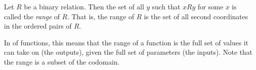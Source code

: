 \documentclass{article}
\begin{document}
Let $R$ be a binary relation.  Then the set of all $y$ such that $x R y$ for some $x$ is called the \emph{range} of $R$.  That is, the range of $R$ is the set of all second coordinates in the ordered pairs of $R$.

In  of functions, this means that the range of a function is the full set of values it can take on (the outputs), given the full set of parameters (the inputs).  Note that the range is a subset of the codomain.
\end{document}
